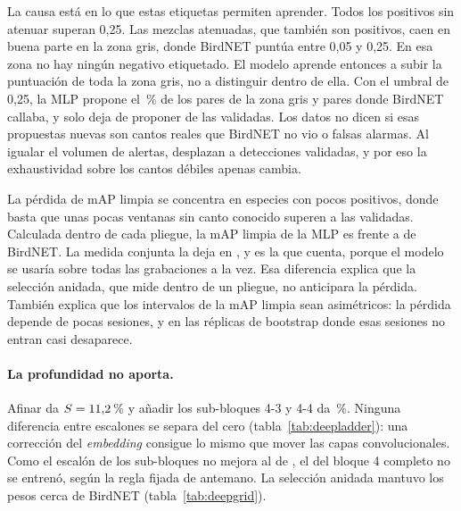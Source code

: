 La causa está en lo que estas etiquetas permiten aprender. Todos los positivos sin atenuar superan 0,25. Las mezclas atenuadas, que también son
positivos, caen en buena parte en la zona gris, donde BirdNET puntúa entre 0,05 y 0,25. En esa zona no hay ningún negativo etiquetado.
El modelo aprende entonces a subir la puntuación de toda la zona gris, no a distinguir dentro de ella. Con el umbral de 0,25, la MLP propone el
\deepGrayUpMlp\,\% de los pares de la zona gris y \deepSilentUpMlp{} pares donde BirdNET callaba, y solo deja de proponer \deepValidLostMlp{} de las
\deepCatP{} validadas. Los datos no dicen si esas propuestas nuevas son cantos reales que BirdNET no vio o falsas alarmas. Al igualar el volumen de
alertas, desplazan a detecciones validadas, y por eso la exhaustividad sobre los cantos débiles apenas cambia.

La pérdida de mAP limpia se concentra en especies con pocos positivos, donde basta que unas pocas ventanas sin canto conocido superen a las
validadas. Calculada dentro de cada pliegue, la mAP limpia de la MLP es \deepCleanFoldMlp{} frente a \deepCleanFoldBirdnet{} de BirdNET. La medida conjunta
la deja en \deepCleanMlp, y es la que cuenta, porque el modelo se usaría sobre todas las grabaciones a la vez. Esa diferencia explica que la
selección anidada, que mide dentro de un pliegue, no anticipara la pérdida. También explica que los intervalos de la mAP limpia sean asimétricos:
la pérdida depende de pocas sesiones, y en las réplicas de bootstrap donde esas sesiones no entran casi desaparece.

\paragraph{La profundidad no aporta.}
Afinar  da $S = 11{,}2$\,\% y añadir los sub-bloques 4-3 y 4-4 da \deepAttDeep\,\%. Ninguna diferencia entre escalones se separa del
cero (tabla~\ref{tab:deepladder}): una corrección del \emph{embedding} consigue lo mismo que mover las capas convolucionales.
Como el escalón de los sub-bloques no mejora al de , el del bloque 4 completo no se entrenó, según la regla fijada de antemano.
La selección anidada mantuvo los pesos cerca de BirdNET (tabla~\ref{tab:deepgrid}).

\begin{table}[H]
  \centering\small
  \caption{Comparaciones pareadas entre modelos (mismos pliegues, misma semilla y mismo banco de mezclas).}\label{tab:deepladder}
\end{table}


